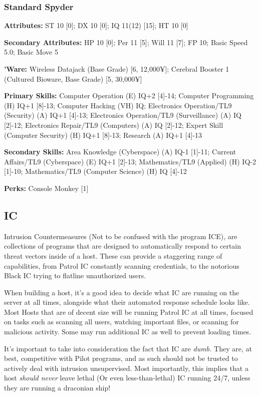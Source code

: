 \begin{multicols*}{3}
	\subsubsection*{Standard Spyder}
	
	\textbf{Attributes:}
	ST 10 [0]; DX 10 [0]; IQ 11(12) [15]; HT 10 [0]
	
	\textbf{Secondary Attributes:} HP 10 [0]; Per 11 [5]; Will 11 [7]; FP 10; Basic Speed 5.0; Basic Move 5
	
	\textbf{'Ware:} 
	Wireless Datajack (Base Grade) [6, 12,000¥]; Cerebral Booster 1 (Cultured Bioware, Base Grade) [5, 30,000¥]
	
	\textbf{Primary Skills:} 
	Computer Operation (E) IQ+2 [4]-14; Computer Programming (H) IQ+1 [8]-13; Computer Hacking (VH) IQ; Electronics Operation/TL9 (Security) (A) IQ+1 [4]-13; Electronics Operation/TL9 (Surveillance) (A) IQ [2]-12; Electronics Repair/TL9 (Computers) (A) IQ [2]-12; Expert Skill (Computer Security) (H) IQ+1 [8]-13; Research (A) IQ+1 [4]-13
	
	\textbf{Secondary Skills:} 
	Area Knowledge (Cyberspace) (A) IQ-1 [1]-11; Current Affairs/TL9 (Cyberspace) (E) IQ+1 [2]-13; Mathematics/TL9 (Applied) (H) IQ-2 [1]-10; Mathematics/TL9 (Computer Science) (H) IQ [4]-12
	
	\textbf{Perks:}
	Console Monkey [1]
	
	\subsection{IC}
	
	Intrusion Countermeasures (Not to be confused with the program ICE), are collections of programs that are designed to automatically respond to certain threat vectors inside of a host. These can provide a staggering range of capabilities, from Patrol IC constantly scanning credentials, to the notorious Black IC trying to flatline unauthorized users.
	
	When building a host, it's a good idea to decide what IC are running on the server at all times, alongside what their automated response schedule looks like. Most Hosts that are of decent size will be running Patrol IC at all times, focused on tasks such as scanning all users, watching important files, or scanning for malicious activity. Some may run additional IC as well to prevent loading times.
	
	It's important to take into consideration the fact that IC are \textit{dumb.} They are, at best, competitive with Pilot programs, and as such should not be trusted to actively deal with intrusion unsupervised. Most importantly, this implies that a host \textit{should never} leave lethal (Or even less-than-lethal) IC running 24/7, unless they are running a draconian ship! 
	

\end{multicols*}
